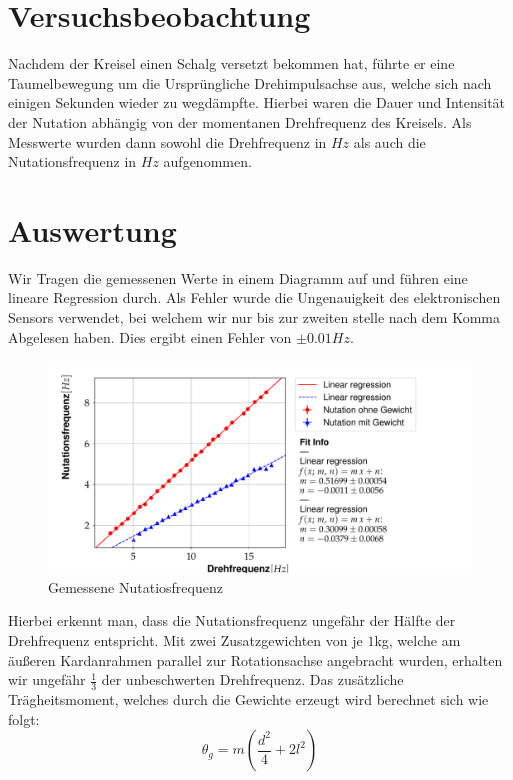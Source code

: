 \documentclass{include/protokollclass}
\begin{document}
    \section{Versuchsbeobachtung}
    Nachdem der Kreisel einen Schalg versetzt bekommen hat, führte er eine Taumelbewegung um die Ursprüngliche Drehimpulsachse aus, welche sich nach einigen Sekunden wieder zu wegdämpfte. Hierbei waren die Dauer und Intensität der Nutation abhängig von der momentanen Drehfrequenz des Kreisels. Als Messwerte wurden dann sowohl die Drehfrequenz in $Hz$ als auch die Nutationsfrequenz in $Hz$ aufgenommen.
    \newpage
    \section{Auswertung}
    Wir Tragen die gemessenen Werte in einem Diagramm auf und führen eine lineare Regression durch. Als Fehler wurde die Ungenauigkeit des elektronischen Sensors verwendet, bei welchem wir nur bis zur zweiten stelle nach dem Komma Abgelesen haben. Dies ergibt einen Fehler von $\pm0.01Hz$.
    \begin{figure}[h]
        \centering
        \includegraphics[scale=0.5]{fig/kafe_nutation.pdf}
        \caption{Gemessene Nutatiosfrequenz}
        \label{fig:nuFig}
    \end{figure}
    
    Hierbei erkennt man, dass die Nutationsfrequenz ungefähr der Hälfte der Drehfrequenz entspricht. Mit zwei Zusatzgewichten von je $1$kg, welche am äußeren Kardanrahmen parallel zur Rotationsachse angebracht wurden, erhalten wir ungefähr $\frac{1}{3}$ der unbeschwerten Drehfrequenz. Das zusätzliche Trägheitsmoment, welches durch die Gewichte erzeugt wird berechnet sich wie folgt:
    \begin{equation}\label{eq: theta_g}
        \theta_g=m\left(\frac{d^2}{4}+2l^2\right)
    \end{equation}
    
\end{document}
